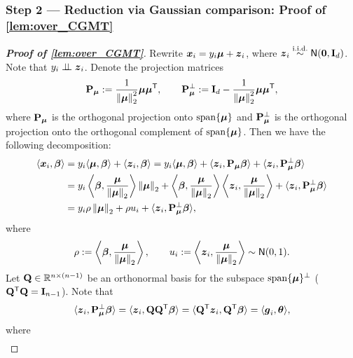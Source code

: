 \subsubsection{Step 2 --- Reduction via Gaussian comparison: Proof of \cref{lem:over_CGMT}}
\label{subsubsec:over_CGMT}
\begin{proof}[\textbf{Proof of \cref{lem:over_CGMT}}]
Rewrite $\xx_i = y_i \bmu + \zz_i$, where $\zz_i \iidsim \normal(\bzero, \bI_d)$. Note that $y_i \indep \zz_i$. Denote the projection matrices
\begin{equation*}
    \bP_{\vmu} := \frac{1}{\norm{\vmu}_2^2} \vmu \vmu^\top,
    \qquad 
    \bP_{\vmu}^\perp := \bI_d - \frac{1}{\norm{\vmu}_2^2} \vmu \vmu^\top,
\end{equation*}
where $\bP_{\vmu}$ is the orthogonal projection onto $\spann\{ \vmu \}$ and $\bP_{\vmu}^\perp$ is the orthogonal projection onto the orthogonal complement of $\spann\{ \vmu \}$. Then we have the following decomposition:
\begin{equation*}
    \begin{aligned}
        \< \xx_i, \bbeta \> 
    & = y_i \< \bmu, \bbeta \> + \< \zz_i, \bbeta \> 
    = y_i \< \bmu, \bbeta \> + \< \zz_i, \bP_{\vmu} \bbeta \> + 
    \< \zz_i, \bP_{\vmu}^\perp \bbeta \>  \\
    & = y_i \left\< \bbeta, \frac{\bmu}{\norm{\bmu}_2} \right\> \norm{\bmu}_2 
    +  \left\< \bbeta, \frac{\bmu}{\norm{\bmu}_2} \right\> \left\< \zz_i, \frac{\bmu}{\norm{\bmu}_2} \right\>
    + \< \zz_i , \bP_{\bmu}^{\perp} \bbeta \> \\
    & = y_i \rho \norm{\vmu}_2 + \rho u_i + \< \zz_i , \bP_{\bmu}^{\perp} \bbeta \>,
    \end{aligned}
\end{equation*}
where
\begin{equation*}
    \rho := \left\< \bbeta, \frac{\bmu}{\norm{\bmu}_2} \right\>,
    \qquad
    u_i := \left\< \zz_i, \frac{\bmu}{\norm{\bmu}_2} \right\> \sim \normal(0, 1).
\end{equation*}
Let $\bQ \in \R^{n \times (n - 1)}$ be an orthonormal basis for the subspace $\spann\{ \vmu \}^\perp$ ($\bQ^\top \bQ = \bI_{n-1}$). Note that
\begin{equation*}
    \< \zz_i , \bP_{\bmu}^{\perp} \bbeta \>
    = \< \zz_i, \bQ \bQ^\top \bbeta \> 
    = \< \bQ^\top \zz_i,  \bQ^\top \bbeta \> 
    = \< \vg_i , \vtheta \>,
\end{equation*}
where
\begin{equation*}
    \begin{gathered}

\end{gathered}
\end{equation*}
\end{proof}

